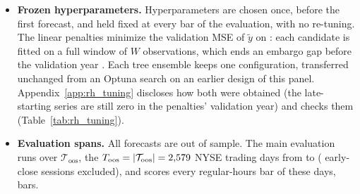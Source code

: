\begin{itemize}
  its estimation sample is $\mathcal I = \mathcal I_{\mathrm{rh}}$, one observation per bar, as in intraday
  volatility forecasting \citep{EngleSokalska2012, ZhangZhangCucuringuQian2024}, while its predictors, the HAR
  components and trailing averages of Section~\ref{sec:rh_predictors}, are computed on the full grid of $M$ intervals,
  whose overnight intervals also carry information \citep{ChenYuZivot2012, StroudJohannes2014, TodorovaSoucek2014}.
  We write $(t,i) \ominus j$ for
  the $j$th observation of $\mathcal I$ before $(t,i)$; unlike the grid lag $(t, i-j)$ of Section~\ref{sec:rh_data}, it
  skips the intervals outside $\mathcal I$. The forecast of interval $(t,i)$ is formed at the start of the interval,
  from the information available then, by a model fitted on the rolling window
  \[
    \mathcal W_{t,i} = \{(t,i) \ominus j : j = 1, \dots, W\}, \qquad W = \rhorWindowBars ,
  \]
  the bars of about \rhorWindowDays{} trading days. Every model is refitted at every bar, by least squares on
  $\tilde y$ over $\mathcal W_{t,i}$, the penalized regressions adding their penalty. NYSE early-close sessions are
  not in the estimation sample; the shortened regular-hours sessions of NYSE holidays are, and they are forecast but
  not scored (Section~\ref{sec:rh_data}).
\item \textbf{Frozen hyperparameters.} Hyperparameters are chosen once, before the first forecast, and held fixed at
  every bar of the evaluation, with no re-tuning. The linear penalties minimize the validation MSE of $\tilde y$ on
  \rhorPenSample: each candidate is fitted on a full window of $W$ observations, which ends an embargo gap before the
  validation year \citep{gu2020empirical}. Each tree ensemble keeps one configuration, transferred unchanged from an
  Optuna search on an earlier design of this panel. Appendix~\ref{app:rh_tuning} discloses how both were obtained
  (the late-starting series are still zero in the penalties' validation year) and checks them
  (Table~\ref{tab:rh_tuning}).
\item \textbf{Evaluation spans.} All forecasts are out of sample. The main evaluation runs over
  $\mathcal T_{\mathrm{oos}}$, the $T_{\mathrm{oos}} = |\mathcal T_{\mathrm{oos}}| = 2{,}579$ NYSE trading days
  from \rhorSpanStart{} to \rhorSpanEnd{} (\rhorEarlyCloses{} early-close sessions excluded), and scores every
  regular-hours bar of these days, \rhorNIntB{} bars.
\end{itemize}

